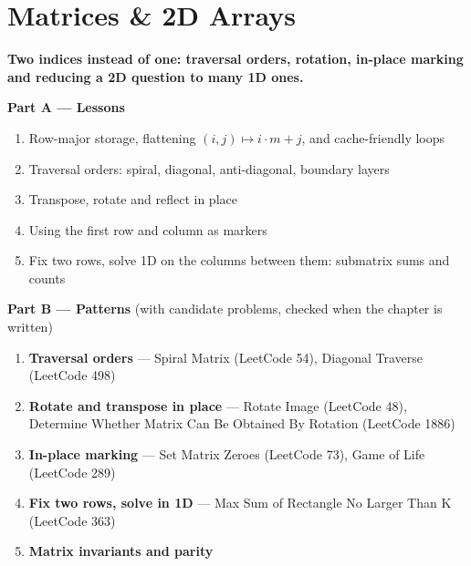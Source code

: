 \chapter{Matrices \& 2D Arrays}
\label{ch:matrices}

\begin{tcolorbox}[enhanced, colback=white, colframe=secondaryblue, boxrule=1pt, arc=2mm]
\textbf{\large\textcolor{primaryblue}{Two indices instead of one: traversal orders, rotation, in-place marking and reducing a 2D question to many 1D ones.}}
\end{tcolorbox}


\begin{plannedbox}
\textbf{Part A --- Lessons}
\begin{enumerate}[leftmargin=*, label=\textbf{A\arabic*.}, itemsep=1pt]
    \item Row-major storage, flattening $(i, j) \mapsto i\cdot m + j$, and cache-friendly loops
    \item Traversal orders: spiral, diagonal, anti-diagonal, boundary layers
    \item Transpose, rotate and reflect in place
    \item Using the first row and column as markers
    \item Fix two rows, solve 1D on the columns between them: submatrix sums and counts
\end{enumerate}
\textbf{Part B --- Patterns} (with candidate problems, checked when the chapter is written)
\begin{enumerate}[leftmargin=*, label=\textbf{P\arabic*.}, itemsep=1pt]
    \item \textbf{Traversal orders} --- Spiral Matrix {\small\color{darkgray}(LeetCode 54)}, Diagonal Traverse {\small\color{darkgray}(LeetCode 498)}
    \item \textbf{Rotate and transpose in place} --- Rotate Image {\small\color{darkgray}(LeetCode 48)}, Determine Whether Matrix Can Be Obtained By Rotation {\small\color{darkgray}(LeetCode 1886)}
    \item \textbf{In-place marking} --- Set Matrix Zeroes {\small\color{darkgray}(LeetCode 73)}, Game of Life {\small\color{darkgray}(LeetCode 289)}
    \item \textbf{Fix two rows, solve in 1D} --- Max Sum of Rectangle No Larger Than K {\small\color{darkgray}(LeetCode 363)}
    \item \textbf{Matrix invariants and parity}
\end{enumerate}
\end{plannedbox}
